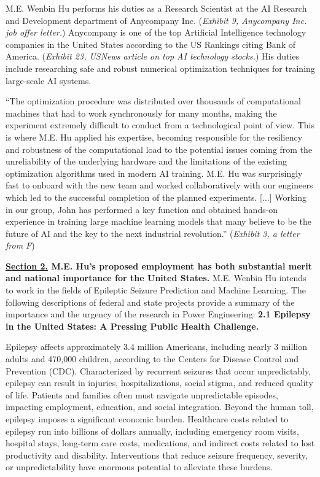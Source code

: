\documentclass{article}
\begin{document}
M.E. Wenbin Hu performs his duties as a Research Scientist at the AI Research and Development department of Anycompany Inc. ({\it Exhibit 9, Anycompany Inc. job offer letter.}) Anycompany is one of the top Artificial Intelligence technology companies in the United States according to the US Rankings citing Bank of America. ({\it Exhibit 23, USNews article on top AI technology stocks.}) His duties include researching safe and robust numerical optimization techniques for training large-scale AI systems.

“The optimization procedure was distributed over thousands of computational machines that had to work synchronously for many months, making the experiment extremely difficult to conduct from a technological point of view. This is where M.E. Hu applied his expertise, becoming responsible for the resiliency and robustness of the computational load to the potential issues coming from the unreliability of the underlying hardware and the limitations of the existing optimization algorithms used in modern AI training. M.E. Hu was surprisingly fast to onboard with the new team and worked collaboratively with our engineers which led to the successful completion of the planned experiments. [...] Working in our group, John has performed a key function and obtained hands-on experience in training large machine learning models that many believe to be the future of AI and the key to the next industrial revolution.” ({\it Exhibit 3, a letter from F}) 


\clearpage


{\bf \underline{Section 2.} M.E. Hu’s proposed employment has both substantial merit and national importance for the United States.}
M.E. Wenbin Hu intends to work in the fields of Epileptic Seizure Prediction and Machine Learning. The following descriptions of federal and state projects provide a summary of the importance and the urgency of the research in Power Engineering:
{\bf 2.1 Epilepsy in the United States: A Pressing Public Health Challenge. }



Epilepsy affects approximately 3.4 million Americans, including nearly 3 million adults and 470,000 children, according to the Centers for Disease Control and Prevention (CDC). Characterized by recurrent seizures that occur unpredictably, epilepsy can result in injuries, hospitalizations, social stigma, and reduced quality of life. Patients and families often must navigate unpredictable episodes, impacting employment, education, and social integration.
Beyond the human toll, epilepsy imposes a significant economic burden. Healthcare costs related to epilepsy run into billions of dollars annually, including emergency room visits, hospital stays, long-term care costs, medications, and indirect costs related to lost productivity and disability. Interventions that reduce seizure frequency, severity, or unpredictability have enormous potential to alleviate these burdens.
\end{document}
